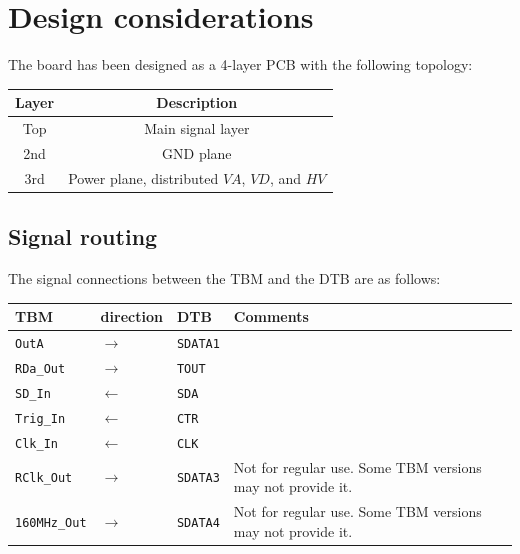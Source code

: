 \chapter{Design considerations}
The board has been designed as a 4-layer PCB with the following topology:
\begin{center}
\begin{tabular}{cc}
	\toprule %
Layer & Description \\
	\midrule %
Top & Main signal layer \\
2nd & GND plane \\
3rd & Power plane, distributed $VA$, $VD$, and $HV$
	\bottomrule %
\end{tabular}
\end{center}

\section{Signal routing}

The signal connections between the TBM and the DTB are as follows:
\begin{center}
\begin{tabular}{llll}
    \toprule %
    TBM & direction & DTB & Comments \\
    \midrule %
    \texttt{OutA}        & $\rightarrow$ & \texttt{SDATA1} & \\
    \texttt{RDa\_Out}    & $\rightarrow$ & \texttt{TOUT}   & \\
    \texttt{SD\_In}      & $\leftarrow$  & \texttt{SDA}    & \\
    \texttt{Trig\_In}    & $\leftarrow$  & \texttt{CTR}    & \\
    \texttt{Clk\_In}     & $\leftarrow$  & \texttt{CLK}    & \\
    \texttt{RClk\_Out}   & $\rightarrow$ & \texttt{SDATA3} & Not for regular use. Some TBM versions may not provide it. \\
    \texttt{160MHz\_Out} & $\rightarrow$ & \texttt{SDATA4} & Not for regular use. Some TBM versions may not provide it. \\
    \bottomrule %
\end{tabular}
\end{center}


